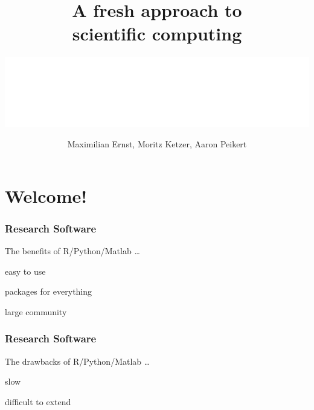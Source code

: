 \documentclass[notes]{beamer}
\title{\Huge A fresh approach to \\ scientific computing}
\date{Maximilian Ernst, Moritz Ketzer, Aaron Peikert}
\author{\includegraphics[width=.49\textwidth]{figures/mpib_logo/MPIB_Logo_EN_horizontal_RGB_White.png}}
\def\\{}%
\newenvironment{wideitemize}{
    \itemize\addtolength{\itemsep}{15pt}\addtolength{\topsep}{10pt}}{\enditemize}
\begin{document}
	\setcounter{showProgressBar}{0}
	\setcounter{showSlideNumbers}{0}

	{
    }

    {
	\frame{
	\titlepage}
	}

	\setcounter{showProgressBar}{0}
	\setcounter{showSlideNumbers}{0}

	\section{Welcome!}

    \begin{frame}
    \frametitle{Research Software}
    The benefits of R/Python/Matlab \ldots
    \vspace{1cm}
        \begin{wideitemize}
            \item easy to use
            \item packages for everything
            \item large community
        \end{wideitemize}
    \end{frame}

    \begin{frame}
    \frametitle{Research Software}
    The drawbacks of R/Python/Matlab \ldots
    \vspace{1cm}
        \begin{wideitemize}
            \item slow
            \item difficult to extend
        \end{wideitemize}
    \end{frame}
\end{document}
